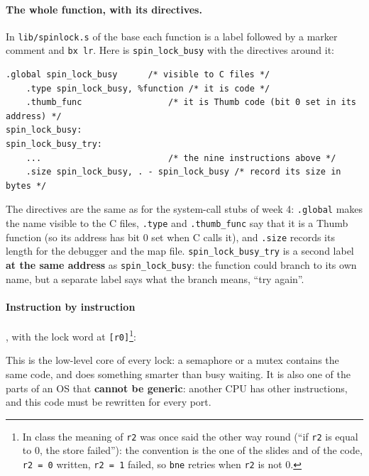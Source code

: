 \paragraph{The whole function, with its directives.} In \texttt{lib/spinlock.s} of the base each function is a label followed by a marker comment and \texttt{bx lr}. Here is \texttt{spin\_lock\_busy} with the directives around it:
\begin{lstlisting}[basicstyle=\ttfamily\scriptsize]
    .global spin_lock_busy      /* visible to C files */
    .type spin_lock_busy, %function /* it is code */
    .thumb_func                 /* it is Thumb code (bit 0 set in its address) */
spin_lock_busy:
spin_lock_busy_try:
    ...                         /* the nine instructions above */
    .size spin_lock_busy, . - spin_lock_busy /* record its size in bytes */
\end{lstlisting}
The directives are the same as for the system-call stubs of week 4: \texttt{.global} makes the name visible to the C files, \texttt{.type} and \texttt{.thumb\_func} say that it is a Thumb function (so its address has bit 0 set when C calls it), and \texttt{.size} records its length for the debugger and the map file. \texttt{spin\_lock\_busy\_try} is a second label \textbf{at the same address} as \texttt{spin\_lock\_busy}: the function could branch to its own name, but a separate label says what the branch means, ``try again''.

\paragraph{Instruction by instruction}, with the lock word at \texttt{[r0]}\footnote{In class the meaning of \texttt{r2} was once said the other way round (``if \texttt{r2} is equal to 0, the store failed''): the convention is the one of the slides and of the code, \texttt{r2 = 0} written, \texttt{r2 = 1} failed, so \texttt{bne} retries when \texttt{r2} is not 0.}:

This is the low-level core of every lock: a semaphore or a mutex contains the same code, and does something smarter than busy waiting. It is also one of the parts of an OS that \textbf{cannot be generic}: another CPU has other instructions, and this code must be rewritten for every port.

